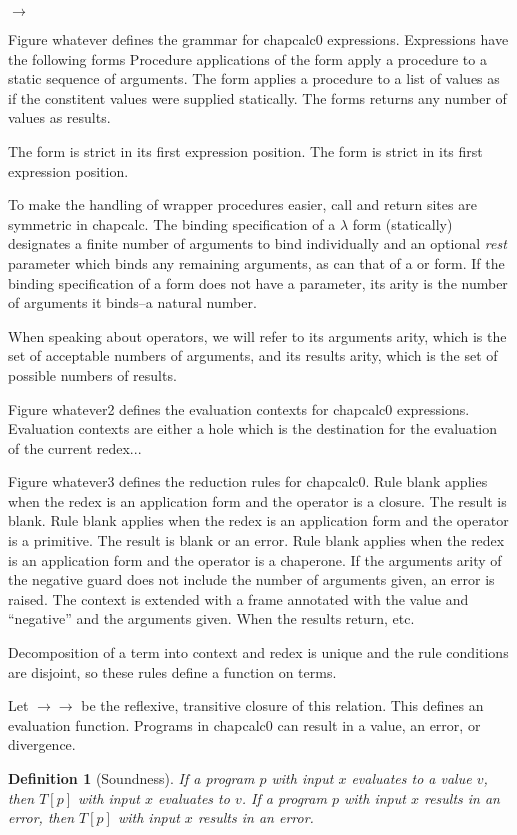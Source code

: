 \documentclass{sigplanconf}
\newtheorem{definition}{Definition}
\begin{document}
$\longrightarrow$

Figure whatever defines the grammar for chapcalc0 expressions. Expressions  have the following forms
Procedure applications of the form  apply a procedure to a static sequence of arguments.
The  form applies a procedure to a list of values as if the constitent values were supplied statically.
The  forms returns any number of values as results. 

The  form is strict in its first expression position.
The  form is strict in its first expression position.

To make the handling of wrapper procedures easier, call and return sites are symmetric in chapcalc. The binding specification of a $\lambda$ form (statically) designates a finite number of arguments to bind individually and an optional \emph{rest} parameter which binds any remaining arguments, as can that of a  or  form. If the binding specification of a form does not have a  parameter, its arity is the number of arguments it binds--a natural number.

When speaking about operators, we will refer to its arguments arity, which is the set of acceptable numbers of arguments, and its results arity, which is the set of possible numbers of results.

Figure whatever2 defines the evaluation contexts for chapcalc0 expressions.
Evaluation contexts are either a hole which is the destination for the evaluation of the current redex...

Figure whatever3 defines the reduction rules for chapcalc0.
Rule blank applies when the redex is an application form and the operator is a closure.
The result is blank.
Rule blank applies when the redex is an application form and the operator is a primitive.
The result is blank or an error.
Rule blank applies when the redex is an application form and the operator is a chaperone.
If the arguments arity of the negative guard does not include the number of arguments given, an error is raised.
The context is extended with a frame annotated with the value and ``negative'' and the arguments given.
When the results return, etc.

Decomposition of a term into context and redex is unique and the rule conditions are disjoint, so these rules define a function on terms.

Let $\longrightarrow\longrightarrow$ be the reflexive, transitive closure of this relation.
This defines an evaluation function.
Programs in chapcalc0 can result in a value, an error, or divergence.
\begin{definition}[Soundness]
If a program $p$ with input $x$ evaluates to a value $v$, then $T[p]$ with input $x$ evaluates to $v$.
If a program $p$ with input $x$ results in an error, then $T[p]$ with input $x$ results in an error.
\end{definition}
\end{document}
